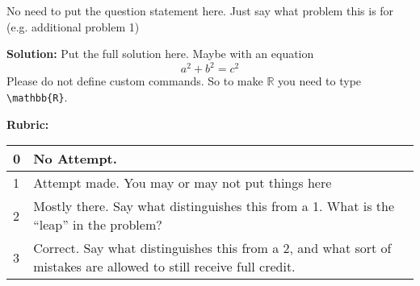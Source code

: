 \documentclass[letterpaper,11pt]{article}
\newenvironment{solution}
  {\flushleft\color{blue}\textbf{Solution:}}
  {}
\begin{document}
\noindent No need to put the question statement here. Just say what problem this is for (e.g. additional problem 1)

\begin{solution} Put the full solution here. Maybe with an equation
    \[a^2 + b^2 = c^2\]
Please do not define custom commands. So to make $\mathbb{R}$ you need to type \texttt{\textbackslash mathbb\{R\}}.


\textbf{Rubric:}
\begin{table}[h!]
    \centering
    \color{blue}
    \begin{tabular}{|p{0.25in}|p{5in}|}
        \hline
        0 & No Attempt. \\ \hline
        1 & Attempt made. You may or may not put things here \\ \hline
        2 & Mostly there. Say what distinguishes this from a 1. What is the ``leap'' in the problem? \\ \hline
        3 & Correct. Say what distinguishes this from a 2, and what sort of mistakes are allowed to still receive full credit. \\ \hline
    \end{tabular}
\end{table}
\end{solution}
\end{document}
